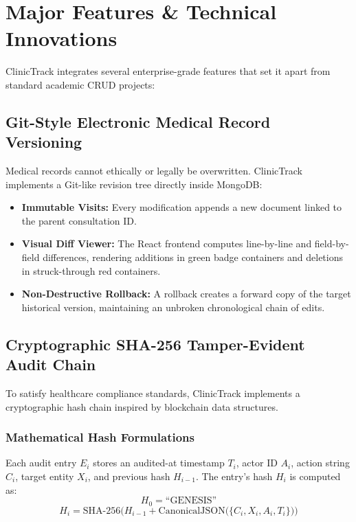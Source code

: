 \documentclass[12pt,a4paper,oneside]{report}
\begin{document}
\chapter{Major Features \& Technical Innovations}

ClinicTrack integrates several enterprise-grade features that set it apart from standard academic CRUD projects:

\section{Git-Style Electronic Medical Record Versioning}
Medical records cannot ethically or legally be overwritten. ClinicTrack implements a Git-like revision tree directly inside MongoDB:
\begin{itemize}
    \item \textbf{Immutable Visits:} Every modification appends a new document linked to the parent consultation ID.
    \item \textbf{Visual Diff Viewer:} The React frontend computes line-by-line and field-by-field differences, rendering additions in green badge containers and deletions in struck-through red containers.
    \item \textbf{Non-Destructive Rollback:} A rollback creates a forward copy of the target historical version, maintaining an unbroken chronological chain of edits.
\end{itemize}

\section{Cryptographic SHA-256 Tamper-Evident Audit Chain}
To satisfy healthcare compliance standards, ClinicTrack implements a cryptographic hash chain inspired by blockchain data structures. 

\subsection{Mathematical Hash Formulations}
Each audit entry $E_i$ stores an audited-at timestamp $T_i$, actor ID $A_i$, action string $C_i$, target entity $X_i$, and previous hash $H_{i-1}$. The entry's hash $H_i$ is computed as:
\begin{equation}
    H_0 = \text{``GENESIS''}
\end{equation}
\begin{equation}
    H_i = \text{SHA-256}\Big(H_{i-1} + \text{CanonicalJSON}\big(\{C_i, X_i, A_i, T_i\}\big)\Big)
\end{equation}
\end{document}
